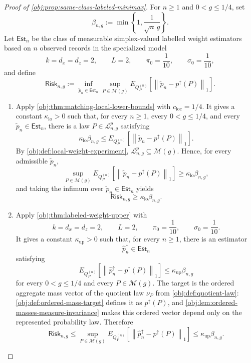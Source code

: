 \begin{proof}[Proof of \cref{obj:prop:same-class-labeled-minimax}]
For \(n\ge 1\) and \(0<g\le 1/4\), set
\[
\beta_{n,g}:=\min\left\{1,\frac{1}{\sqrt n\,g}\right\}.
\]
Let \(\mathsf{Est}_n\) be the class of measurable simplex-valued labelled weight estimators based on \(n\) observed records in the specialized model
\[
k=d_x=d_z=2,\qquad L=2,\qquad \pi_0=\frac1{10},\qquad \sigma_0=\frac1{10},
\]
and define
\[
\mathsf{Risk}_{n,g}
:=
\inf_{\widetilde p_n\in\mathsf{Est}_n}
\sup_{P\in\mathcal M(g)}
E_{Q_P^{(n)}}\!\left[
\left\|\widetilde p_n-p^{\uparrow}(P)\right\|_1
\right].
\]

\begin{enumerate}
\item Apply \cref{obj:thm:matching-local-lower-bounds} with \(c_{\mathrm{loc}}=1/4\). It gives a constant \(\kappa_{\mathrm{lo}}>0\) such that, for every \(n\ge1\), every \(0<g\le1/4\), and every \(\widetilde p_n\in\mathsf{Est}_n\), there is a law \(P\in\mathcal L_{n,g}^{p}\) satisfying
\[
\kappa_{\mathrm{lo}}\beta_{n,g}
\le
E_{Q_P^{(n)}}\!\left[
\left\|\widetilde p_n-p^{\uparrow}(P)\right\|_1
\right].
\]
By \cref{obj:def:local-weight-experiment}, \(\mathcal L_{n,g}^{p}\subseteq\mathcal M(g)\). Hence, for every admissible \(\widetilde p_n\),
\[
\sup_{P\in\mathcal M(g)}
E_{Q_P^{(n)}}\!\left[
\left\|\widetilde p_n-p^{\uparrow}(P)\right\|_1
\right]
\ge
\kappa_{\mathrm{lo}}\beta_{n,g},
\]
and taking the infimum over \(\widetilde p_n\in\mathsf{Est}_n\) yields
\[
\mathsf{Risk}_{n,g}\ge \kappa_{\mathrm{lo}}\beta_{n,g}.
\]

\item Apply \cref{obj:thm:labeled-weight-upper} with
\[
k=d_x=d_z=2,\qquad L=2,\qquad \pi_0=\frac1{10},\qquad \sigma_0=\frac1{10}.
\]
It gives a constant \(\kappa_{\mathrm{up}}>0\) such that, for every \(n\ge1\), there is an estimator
\[
\widehat p_n^{\uparrow}\in\mathsf{Est}_n
\]
satisfying
\[
E_{Q_P^{(n)}}\!\left[
\left\|\widehat p_n^{\uparrow}-p^{\uparrow}(P)\right\|_1
\right]
\le
\kappa_{\mathrm{up}}\beta_{n,g}
\]
for every \(0<g\le1/4\) and every \(P\in\mathcal M(g)\). The target is the ordered aggregate mass vector of the quotient law \(\nu_P\) from \cref{obj:def:quotient-law}: \cref{obj:def:ordered-mass-target} defines it as \(p^{\uparrow}(P)\), and \cref{obj:lem:ordered-masses-measure-invariance} makes this ordered vector depend only on the represented probability law. Therefore
\[
\mathsf{Risk}_{n,g}
\le
\sup_{P\in\mathcal M(g)}
E_{Q_P^{(n)}}\!\left[
\left\|\widehat p_n^{\uparrow}-p^{\uparrow}(P)\right\|_1
\right]
\le
\kappa_{\mathrm{up}}\beta_{n,g}.
\]


\end{enumerate}
\end{proof}

